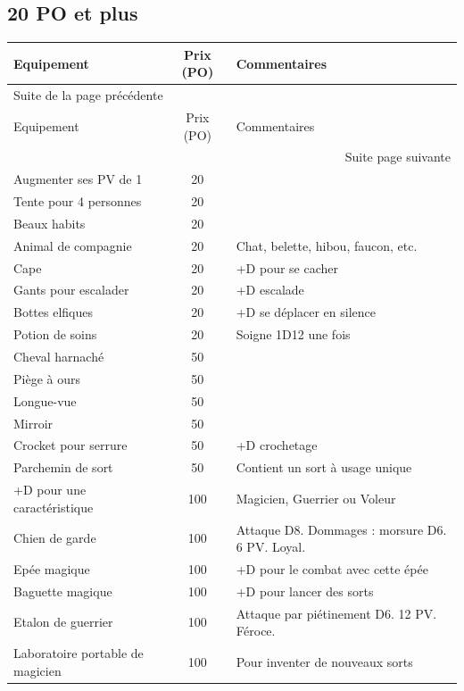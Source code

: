 \documentclass[a4paper, 11pt, twoside]{article}
\begin{document}
\subsection{20 PO et plus}
\label{sec:org525e8fe}

\begin{longtable}{l|c|p{10cm}}
Equipement & Prix (PO) & Commentaires\\
\hline
\endfirsthead
\multicolumn{3}{l}{Suite de la page précédente} \\
\hline

Equipement & Prix (PO) & Commentaires \\

\hline
\endhead
\hline\multicolumn{3}{r}{Suite page suivante} \\
\endfoot
\endlastfoot
\hline
Augmenter ses PV de 1 & 20 & \\
Tente pour 4 personnes & 20 & \\
Beaux habits & 20 & \\
Animal de compagnie & 20 & Chat, belette, hibou, faucon, etc.\\
Cape & 20 & +D pour se cacher\\
Gants pour escalader & 20 & +D escalade\\
Bottes elfiques & 20 & +D se déplacer en silence\\
Potion de soins & 20 & Soigne 1D12 une fois\\
Cheval harnaché & 50 & \\
Piège à ours & 50 & \\
Longue-vue & 50 & \\
Mirroir & 50 & \\
Crocket pour serrure & 50 & +D crochetage\\
Parchemin de sort & 50 & Contient un sort à usage unique\\
+D pour une caractéristique & 100 & Magicien, Guerrier ou Voleur\\
Chien de garde & 100 & Attaque D8. Dommages : morsure D6. 6 PV. Loyal.\\
Epée magique & 100 & +D pour le combat avec cette épée\\
Baguette magique & 100 & +D pour lancer des sorts\\
Etalon de guerrier & 100 & Attaque par piétinement D6. 12 PV. Féroce.\\
Laboratoire portable de magicien & 100 & Pour inventer de nouveaux sorts\\
\end{longtable}
\end{document}
